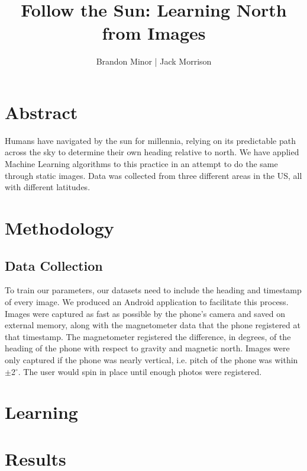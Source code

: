 \documentclass{article}
\begin{document}
\title{Follow the Sun: Learning North from Images}
\author{Brandon Minor | Jack Morrison}
\maketitle

\section{Abstract}

Humans have navigated by the sun for millennia, relying on its predictable path across the sky to determine their own heading relative to north. We have applied Machine Learning algorithms to this practice in an attempt to do the same through static images. Data was collected from three different areas in the US, all with different latitudes. 

\section{Methodology}

\subsection{Data Collection}
To train our parameters, our datasets need to include the heading and timestamp of every image. We produced an Android application to facilitate this process. Images were captured as fast as possible by the phone's camera and saved on external memory, along with the magnetometer data that the phone registered at that timestamp. The magnetometer registered the difference, in degrees, of the heading of the phone with respect to gravity and magnetic north. Images were only captured if the phone was nearly vertical, i.e. pitch of the phone was within $\pm$2$^\circ$. The user would spin in place until enough photos were registered. 

\subsection{}





\section{Learning}






\section{Results}
\end{document}
